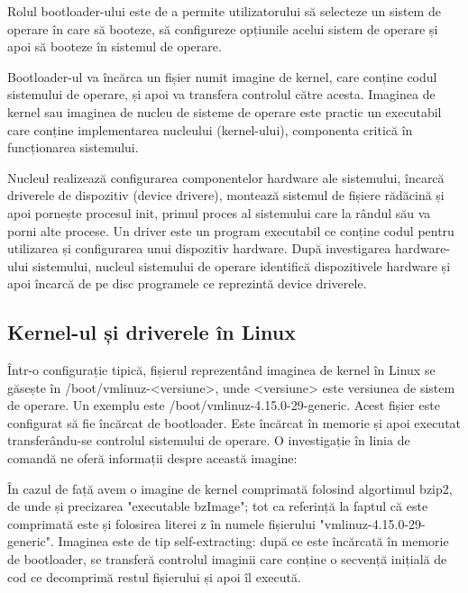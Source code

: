 Rolul bootloader-ului este de a permite utilizatorului să selecteze un sistem de
operare în care să booteze, să configureze opțiunile acelui sistem de operare și
apoi să booteze în sistemul de operare.

Bootloader-ul va încărca un fișier numit imagine de kernel, care conține codul
sistemului de operare, și apoi va transfera controlul către acesta. Imaginea de
kernel sau imaginea de nucleu de sisteme de operare este practic un executabil
care conține implementarea nucleului (kernel-ului), componenta critică în
funcționarea sistemului.

Nucleul realizează configurarea componentelor hardware ale sistemului, încarcă
driverele de dispozitiv (device drivere), montează sistemul de fișiere rădăcină
și apoi pornește procesul init, primul proces al sistemului care la rândul său
va porni alte procese. Un driver este un program executabil ce conține codul
pentru utilizarea și configurarea unui dispozitiv hardware. După investigarea
hardware-ului sistemului, nucleul sistemului de operare identifică dispozitivele
hardware și apoi încarcă de pe disc programele ce reprezintă device driverele.

\subsection{Kernel-ul și driverele în Linux}
\label{sec:boot-bootupos-linux}

Într-o configurație tipică, fișierul reprezentând imaginea de kernel în Linux se
găsește în /boot/vmlinuz-<versiune>, unde <versiune> este versiunea de sistem de
operare. Un exemplu este /boot/vmlinuz-4.15.0-29-generic. Acest fișier este
configurat să fie încărcat de bootloader. Este încărcat în memorie și apoi
executat transferându-se controlul sistemului de operare. O investigație în
linia de comandă ne oferă informații despre această imagine:


În cazul de față avem o imagine de kernel comprimată folosind algortimul bzip2,
de unde și precizarea "executable bzImage"; tot ca referință la faptul că este
comprimată este și folosirea literei z în numele fișierului
"vmlinuz-4.15.0-29-generic". Imaginea este de tip self-extracting: după ce este
încărcată în memorie de bootloader, se transferă controlul imaginii care conține
o secvență inițială de cod ce decomprimă restul fișierului și apoi îl execută.

